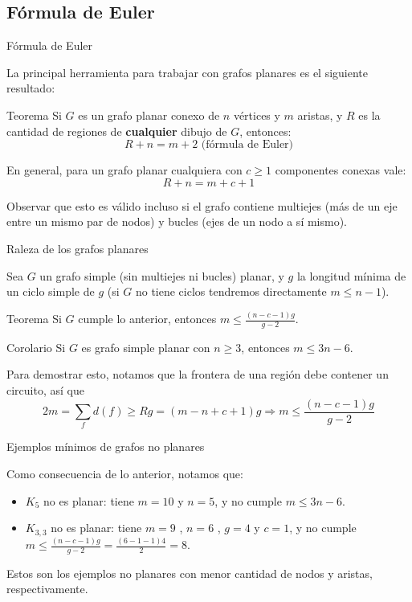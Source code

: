 \documentclass[compress]{beamer}
\begin{document}
\subsection{Fórmula de Euler}

\begin{frame}{Fórmula de Euler}

La principal herramienta para trabajar con grafos planares es el siguiente resultado:

\begin{block}{Teorema}
    Si $G$ es un grafo planar conexo de $n$ vértices y $m$ aristas, y $R$ es la cantidad de regiones de \textbf{cualquier} dibujo de $G$, entonces:    
    $$R + n = m + 2 \mbox{ (fórmula de Euler)}$$
    
    En general, para un grafo planar cualquiera con $c \geq 1$ componentes conexas vale:    
    $$R + n = m + c + 1$$
\end{block}

Observar que esto es válido incluso si el grafo contiene multiejes (más de un eje entre un mismo par de nodos) y bucles (ejes de un nodo a sí mismo).

\end{frame}

\begin{frame}{Raleza de los grafos planares}

Sea $G$ un grafo simple (sin multiejes ni bucles) planar, y $g$ la longitud mínima de un ciclo simple de $g$ (si $G$ no tiene ciclos tendremos directamente $m \leq n-1$).

\begin{block}{Teorema}
    Si $G$ cumple lo anterior, entonces $m \leq \frac{(n-c-1)g}{g-2}$.
\end{block}
\begin{block}{Corolario}
    Si $G$ es grafo simple planar con $n \geq 3$, entonces $m \leq 3n - 6$.
\end{block}

Para demostrar esto, notamos que la frontera de una región debe contener un circuito, así que
$$2m = \sum_f {d(f)} \geq R g = (m-n+c+1) g \Rightarrow m \leq \frac{(n-c-1)g}{g-2}$$

\end{frame}



\begin{frame}{Ejemplos mínimos de grafos no planares}

Como consecuencia de lo anterior, notamos que:

\begin{itemize}
    \item $K_5$ no es planar: tiene $m=10$ y $n=5$, y no cumple $m \leq 3n-6$.
    \item $K_{3,3}$ no es planar: tiene $m=9$ , $n=6$ , $g=4$ y $c=1$, y no cumple $m \leq \frac{(n-c-1)g}{g-2} = \frac{(6-1-1)4}{2} = 8$.
\end{itemize}

Estos son los ejemplos no planares con menor cantidad de nodos y aristas, respectivamente.

\end{frame}
\end{document}
